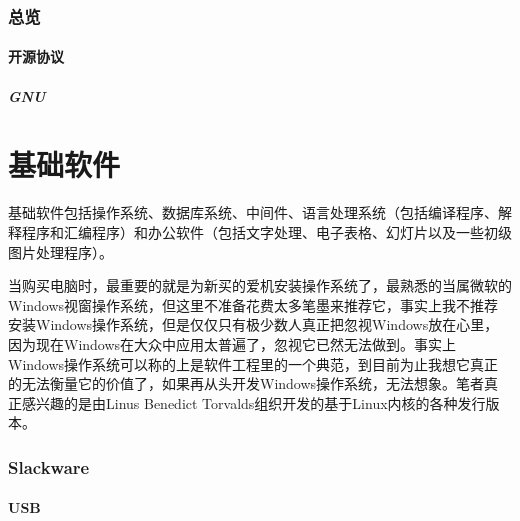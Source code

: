 \documentclass[paper=a4,fontsize=11pt]{article}
\begin{document}
	\newpage
	\section{总览}
	
	\subsection{开源协议}
	
	\subsubsection{GNU}
	
	
	
	\clearpage
	
	\part{基础软件}
	
	基础软件包括操作系统、数据库系统、中间件、语言处理系统（包括编译程序、解释程序和汇编程序）和办公软件（包括文字处理、电子表格、幻灯片以及一些初级图片处理程序）。
		
	\clearpage
	
	当购买电脑时，最重要的就是为新买的爱机安装操作系统了，最熟悉的当属微软的Windows视窗操作系统，但这里不准备花费太多笔墨来推荐它，事实上我不推荐安装Windows操作系统，但是仅仅只有极少数人真正把忽视Windows放在心里，因为现在Windows在大众中应用太普遍了，忽视它已然无法做到。事实上Windows操作系统可以称的上是软件工程里的一个典范，到目前为止我想它真正的无法衡量它的价值了，如果再从头开发Windows操作系统，无法想象。笔者真正感兴趣的是由Linus Benedict Torvalds组织开发的基于Linux内核的各种发行版本。
	
	\newpage
	
	\section{Slackware}
	
	\subsection{USB}
	
\end{document}
